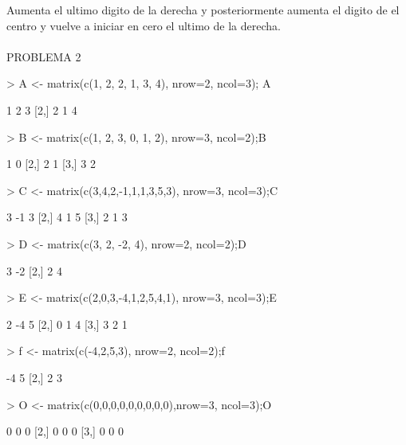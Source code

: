 \documentclass{article}
\begin{document}
Aumenta el ultimo digito de la derecha y posteriormente aumenta el digito de el centro y vuelve a iniciar en cero el ultimo de la derecha.
\\
\\
PROBLEMA 2
\begin{Schunk}
\begin{Sinput}
> A <- matrix(c(1, 2, 2, 1, 3, 4), nrow=2, ncol=3); A
\end{Sinput}
\begin{Soutput}
     [,1] [,2] [,3]
[1,]    1    2    3
[2,]    2    1    4
\end{Soutput}
\begin{Sinput}
> B <- matrix(c(1, 2, 3, 0, 1, 2), nrow=3, ncol=2);B
\end{Sinput}
\begin{Soutput}
     [,1] [,2]
[1,]    1    0
[2,]    2    1
[3,]    3    2
\end{Soutput}
\begin{Sinput}
> C <- matrix(c(3,4,2,-1,1,1,3,5,3), nrow=3, ncol=3);C
\end{Sinput}
\begin{Soutput}
     [,1] [,2] [,3]
[1,]    3   -1    3
[2,]    4    1    5
[3,]    2    1    3
\end{Soutput}
\begin{Sinput}
> D <- matrix(c(3, 2, -2, 4), nrow=2, ncol=2);D
\end{Sinput}
\begin{Soutput}
     [,1] [,2]
[1,]    3   -2
[2,]    2    4
\end{Soutput}
\begin{Sinput}
> E <- matrix(c(2,0,3,-4,1,2,5,4,1), nrow=3, ncol=3);E
\end{Sinput}
\begin{Soutput}
     [,1] [,2] [,3]
[1,]    2   -4    5
[2,]    0    1    4
[3,]    3    2    1
\end{Soutput}
\begin{Sinput}
> f <- matrix(c(-4,2,5,3), nrow=2, ncol=2);f
\end{Sinput}
\begin{Soutput}
     [,1] [,2]
[1,]   -4    5
[2,]    2    3
\end{Soutput}
\begin{Sinput}
> O <- matrix(c(0,0,0,0,0,0,0,0,0),nrow=3, ncol=3);O
\end{Sinput}
\begin{Soutput}
     [,1] [,2] [,3]
[1,]    0    0    0
[2,]    0    0    0
[3,]    0    0    0
\end{Soutput}

\end{Schunk}
\end{document}
